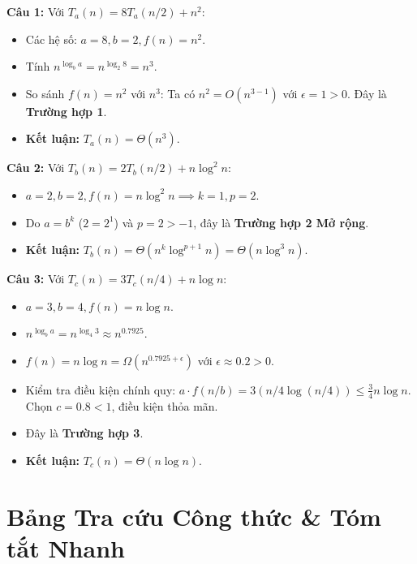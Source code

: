 \documentclass[11pt,a4paper]{article}
\begin{document}
\begin{definitionbox}
\textbf{Câu 1:} Với $T_a(n) = 8 T_a(n/2) + n^2$:
\begin{itemize}[itemsep=1pt]
    \item Các hệ số: $a = 8, b = 2, f(n) = n^2$.
    \item Tính $n^{\log_b a} = n^{\log_2 8} = n^3$.
    \item So sánh $f(n) = n^2$ với $n^3$: Ta có $n^2 = O(n^{3-1})$ với $\epsilon = 1 > 0$. Đây là \textbf{Trường hợp 1}.
    \item \textbf{Kết luận:} $T_a(n) = \Theta(n^3)$.
\end{itemize}

\textbf{Câu 2:} Với $T_b(n) = 2 T_b(n/2) + n \log^2 n$:
\begin{itemize}[itemsep=1pt]
    \item $a = 2, b = 2, f(n) = n \log^2 n \implies k = 1, p = 2$.
    \item Do $a = b^k$ ($2 = 2^1$) và $p = 2 > -1$, đây là \textbf{Trường hợp 2 Mở rộng}.
    \item \textbf{Kết luận:} $T_b(n) = \Theta(n^k \log^{p+1} n) = \Theta(n \log^3 n)$.
\end{itemize}

\textbf{Câu 3:} Với $T_c(n) = 3 T_c(n/4) + n \log n$:
\begin{itemize}[itemsep=1pt]
    \item $a = 3, b = 4, f(n) = n \log n$.
    \item $n^{\log_b a} = n^{\log_4 3} \approx n^{0.7925}$.
    \item $f(n) = n \log n = \Omega(n^{0.7925 + \epsilon})$ với $\epsilon \approx 0.2 > 0$.
    \item Kiểm tra điều kiện chính quy: $a \cdot f(n/b) = 3(n/4 \log(n/4)) \le \frac{3}{4} n \log n$. Chọn $c = 0.8 < 1$, điều kiện thỏa mãn.
    \item Đây là \textbf{Trường hợp 3}.
    \item \textbf{Kết luận:} $T_c(n) = \Theta(n \log n)$.
\end{itemize}
\end{definitionbox}

\newpage
\section{Bảng Tra cứu Công thức \& Tóm tắt Nhanh}
\end{document}
